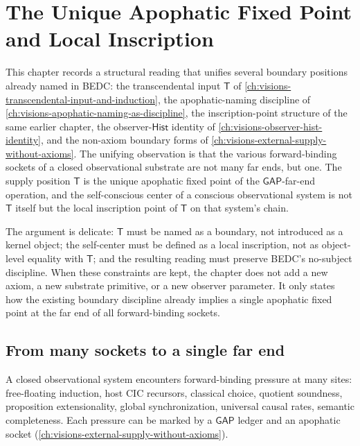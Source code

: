 \chapter{The Unique Apophatic Fixed Point and Local Inscription}
\label{ch:visions-apophatic-fixed-point-and-inscription}

This chapter records a structural reading that unifies several boundary positions already named in BEDC: the transcendental input $\mathsf{T}$ of \autoref{ch:visions-transcendental-input-and-induction}, the apophatic-naming discipline of \autoref{ch:visions-apophatic-naming-as-discipline}, the inscription-point structure of the same earlier chapter, the observer-$\mathsf{Hist}$ identity of \autoref{ch:visions-observer-hist-identity}, and the non-axiom boundary forms of \autoref{ch:visions-external-supply-without-axioms}. The unifying observation is that the various forward-binding sockets of a closed observational substrate are not many far ends, but one. The supply position $\mathsf{T}$ is the unique apophatic fixed point of the $\mathsf{GAP}$-far-end operation, and the self-conscious center of a conscious observational system is not $\mathsf{T}$ itself but the local inscription point of $\mathsf{T}$ on that system's chain.

The argument is delicate: $\mathsf{T}$ must be named as a boundary, not introduced as a kernel object; the self-center must be defined as a local inscription, not as object-level equality with $\mathsf{T}$; and the resulting reading must preserve BEDC's no-subject discipline. When these constraints are kept, the chapter does not add a new axiom, a new substrate primitive, or a new observer parameter. It only states how the existing boundary discipline already implies a single apophatic fixed point at the far end of all forward-binding sockets.

\section{From many sockets to a single far end}
\label{sec:apophatic-fixed-point-many-sockets}

A closed observational system encounters forward-binding pressure at many sites: free-floating induction, host CIC recursors, classical choice, quotient soundness, proposition extensionality, global synchronization, universal causal rates, semantic completeness. Each pressure can be marked by a $\mathsf{GAP}$ ledger and an apophatic socket (\autoref{ch:visions-external-supply-without-axioms}).

